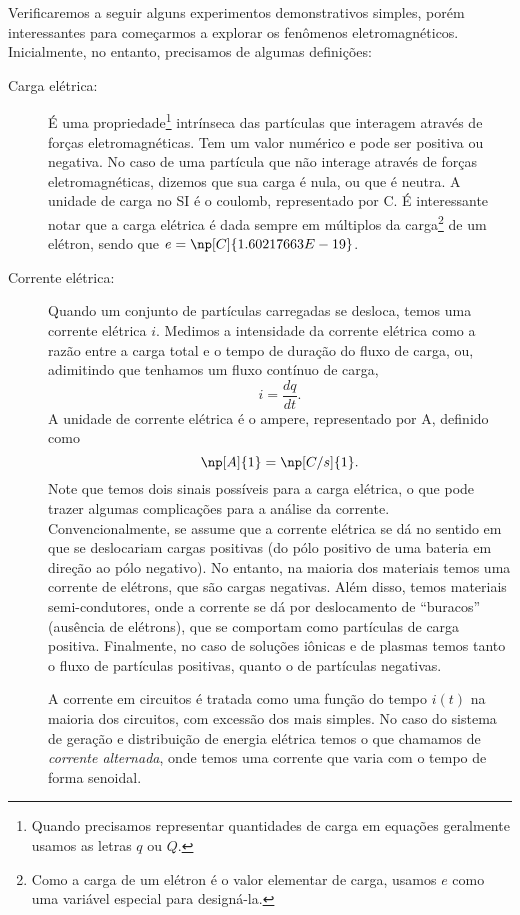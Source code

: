 Verificaremos a seguir alguns experimentos demonstrativos simples, porém interessantes para começarmos a explorar os fenômenos eletromagnéticos. Inicialmente, no entanto, precisamos de algumas definições:
\begin{description}
    \item[Carga elétrica:] É uma propriedade\footnote{Quando precisamos representar quantidades de carga em equações geralmente usamos as letras $q$ ou $Q$.} intrínseca das partículas que interagem através de forças eletromagnéticas. Tem um valor numérico e pode ser positiva ou negativa. No caso de uma partícula que não interage através de forças eletromagnéticas, dizemos que sua carga é nula, ou que é neutra. A unidade de carga no SI é o coulomb, representado por C. É interessante notar que a carga elétrica é dada sempre em múltiplos da carga\footnote{Como a carga de um elétron é o valor elementar de carga, usamos $e$ como uma variável especial para designá-la.} de um elétron, sendo que $e = \np[C]{1.60217663E-19}$.
    
    \item[Corrente elétrica:] Quando um conjunto de partículas carregadas se desloca, temos uma corrente elétrica $i$. Medimos a intensidade da corrente elétrica como a razão entre a carga total e o tempo de duração do fluxo de carga, ou, adimitindo que tenhamos um fluxo contínuo de carga,
    \begin{equation}
        i = \frac{dq}{dt}.
    \end{equation}
    A unidade de corrente elétrica é o ampere, representado por A, definido como
    \begin{equation}
        \np[A]{1} = \np[C/s]{1}.
    \end{equation}
    Note que temos dois sinais possíveis para a carga elétrica, o que pode trazer algumas complicações para a análise da corrente. Convencionalmente, se assume que a corrente elétrica se dá no sentido em que se deslocariam cargas positivas (do pólo positivo de uma bateria em direção ao pólo negativo). No entanto, na maioria dos materiais temos uma corrente de elétrons, que são cargas negativas. Além disso, temos materiais semi-condutores, onde a corrente se dá por deslocamento de ``buracos'' (ausência de elétrons), que se comportam como partículas de carga positiva. Finalmente, no caso de soluções iônicas e de plasmas temos tanto o fluxo de partículas positivas, quanto o de partículas negativas.
    
    A corrente em circuitos é tratada como uma função do tempo $i(t)$ na maioria dos circuitos, com excessão dos mais simples. No caso do sistema de geração e distribuição de energia elétrica temos o que chamamos de \emph{corrente alternada}, onde temos uma corrente que varia com o tempo de forma senoidal.
    

\end{description}
